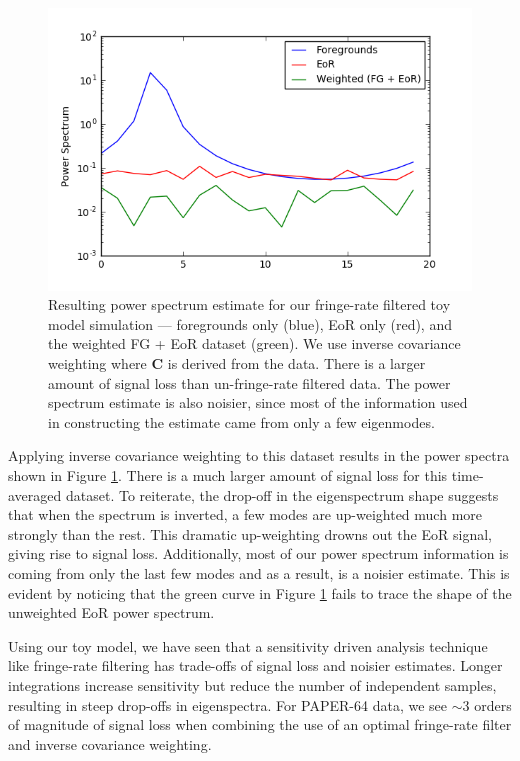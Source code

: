 \documentclass[preprint2,numberedappendix,tighten,twocolappendix]{aastex6}  %
\begin{document}
\begin{figure}
	\centering
	\includegraphics[trim={0.3cm 0.3cm 0.3cm 0.3cm},clip,width=\columnwidth]{plots/toy_sigloss7.png}
	\caption{Resulting power spectrum estimate for our fringe-rate filtered toy model simulation --- foregrounds only (blue), EoR only (red), and the weighted FG + EoR dataset (green). We use inverse covariance weighting where $\textbf{C}$ is derived from the data. There is a larger amount of signal loss than un-fringe-rate filtered data. The power spectrum estimate is also noisier, since most of the information used in constructing the estimate came from only a few eigenmodes.}
	\label{fig:toy_sigloss7}
\end{figure}

Applying inverse covariance weighting to this dataset results in the power spectra shown in Figure \ref{fig:toy_sigloss7}. There is a much larger amount of signal loss for this time-averaged dataset. To reiterate, the drop-off in the eigenspectrum shape suggests that when the spectrum is inverted, a few modes are up-weighted much more strongly than the rest. This dramatic up-weighting drowns out the EoR signal, giving rise to signal loss. Additionally, most of our power spectrum information is coming from only the last few modes and as a result, is a noisier estimate. This is evident by noticing that the green curve in Figure \ref{fig:toy_sigloss7} fails to trace the shape of the unweighted EoR power spectrum.

Using our toy model, we have seen that a sensitivity driven analysis technique like fringe-rate filtering has trade-offs of signal loss and noisier estimates. Longer integrations increase sensitivity but reduce the number of independent samples, resulting in steep drop-offs in eigenspectra. For PAPER-64 data, we see $\sim3$ orders of magnitude of signal loss when combining the use of an optimal fringe-rate filter and inverse covariance weighting. 
\end{document}
